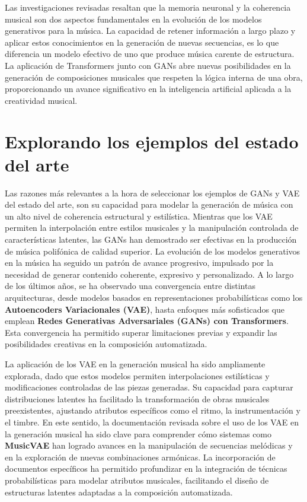 Las investigaciones revisadas resaltan que la memoria neuronal y la coherencia musical son dos aspectos fundamentales en la evolución de los modelos generativos para la música. La capacidad de retener información a largo plazo y aplicar estos conocimientos en la generación de nuevas secuencias, es lo que diferencia un modelo efectivo de uno que produce música carente de estructura. La aplicación de Transformers junto con GANs abre nuevas posibilidades en la generación de composiciones musicales que respeten la lógica interna de una obra, proporcionando un avance significativo en la inteligencia artificial aplicada a la creatividad musical.


\section{Explorando los ejemplos del estado del arte}

Las razones más relevantes a la hora de seleccionar los ejemplos de GANs y VAE del estado del arte, son su capacidad para modelar la generación de música con un alto nivel de coherencia estructural y estilística. Mientras que los VAE permiten la interpolación entre estilos musicales y la manipulación controlada de características latentes, las GANs han demostrado ser efectivas en la producción de música polifónica de calidad superior. La evolución de los modelos generativos en la música ha seguido un patrón de avance progresivo, impulsado por la necesidad de generar contenido coherente, expresivo y personalizado. A lo largo de los últimos años, se ha observado una convergencia entre distintas arquitecturas, desde modelos basados en representaciones probabilísticas como los \textbf{Autoencoders Variacionales (VAE)}, hasta enfoques más sofisticados que emplean \textbf{Redes Generativas Adversariales (GANs) con Transformers}. Esta convergencia ha permitido superar limitaciones previas y expandir las posibilidades creativas en la composición automatizada.

La aplicación de los VAE en la generación musical ha sido ampliamente explorada, dado que estos modelos permiten interpolaciones estilísticas y modificaciones controladas de las piezas generadas. Su capacidad para capturar distribuciones latentes ha facilitado la transformación de obras musicales preexistentes, ajustando atributos específicos como el ritmo, la instrumentación y el timbre. En este sentido, la documentación revisada sobre el uso de los VAE en la generación musical ha sido clave para comprender cómo sistemas como \textbf{MusicVAE} han logrado avances en la manipulación de secuencias melódicas y en la exploración de nuevas combinaciones armónicas. La incorporación de documentos específicos ha permitido profundizar en la integración de técnicas probabilísticas para modelar atributos musicales, facilitando el diseño de estructuras latentes adaptadas a la composición automatizada.

